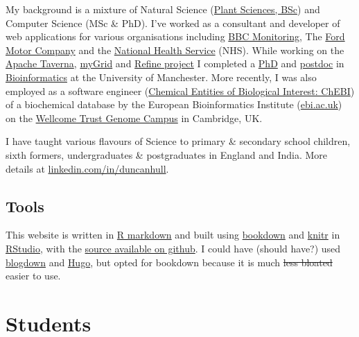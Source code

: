 \documentclass[12pt,]{book}
\begin{document}
My background is a mixture of Natural Science (\href{http://www.plantsciences.manchester.ac.uk/}{Plant Sciences, BSc}) and Computer Science (MSc \& PhD). I've worked as a consultant and developer of web applications for various organisations including \href{https://en.wikipedia.org/wiki/BBC_Monitoring}{BBC Monitoring}, The \href{https://en.wikipedia.org/wiki/Ford_Motor_Company}{Ford Motor Company} and the \href{https://en.wikipedia.org/wiki/National_Health_Service}{National Health Service} (NHS). While working on the \href{https://en.wikipedia.org/wiki/Apache_Taverna}{Apache Taverna}, \href{https://en.wikipedia.org/wiki/MyGrid}{myGrid} and \href{http://www.nactem.ac.uk/pathtext/}{Refine project} I completed a \href{https://ethos.bl.uk/OrderDetails.do?uin=uk.bl.ethos.497578}{PhD} and \href{https://en.wikipedia.org/wiki/Postdoctoral_researcher}{postdoc} in \href{https://en.wikipedia.org/wiki/Bioinformatics}{Bioinformatics} at the University of Manchester. More recently, I was also employed as a software engineer (\href{https://www.ebi.ac.uk/chebi/}{Chemical Entities of Biological Interest: ChEBI}) of a biochemical database by the European Bioinformatics Institute (\href{https://www.ebi.ac.uk}{ebi.ac.uk}) on the \href{https://en.wikipedia.org/wiki/Wellcome_Genome_Campus}{Wellcome Trust Genome Campus} in Cambridge, UK.

I have taught various flavours of Science to primary \& secondary school children, sixth formers, undergraduates \& postgraduates in England and India. More details at \href{https://uk.linkedin.com/in/duncanhull}{linkedin.com/in/duncanhull}.

\hypertarget{tools}{%
\section*{Tools}\label{tools}}

This website is written in \href{https://rmarkdown.rstudio.com/}{R markdown} and built using \href{https://bookdown.org}{bookdown} and \href{https://en.wikipedia.org/wiki/Knitr}{knitr} in \href{https://www.rstudio.com/}{RStudio}, with the \href{https://github.com/dullhunk/hulled}{source available on github}. I could have (should have?) used \href{https://bookdown.org/yihui/blogdown/}{blogdown} and \href{https://gohugo.io}{Hugo}, but opted for bookdown because it is much \sout{less bloated} easier to use. 🔨

\hypertarget{teaching}{%
\chapter{Students}\label{teaching}}
\end{document}
